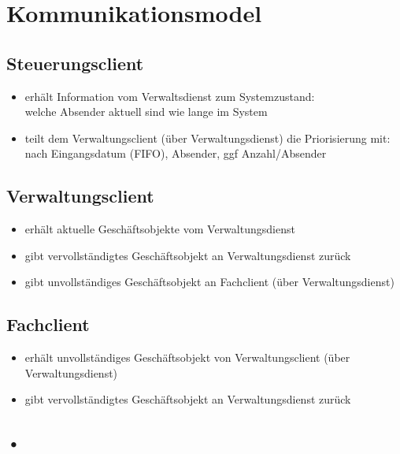\chapter{Kommunikationsmodel}

\begin{comment}
Im Kommunikationsmodell muss ersichtlich sein, welche Informationen zwischen Nutzern in verschiedenen Rollen über das System ausgetauscht werden sollen. Dabei kann es auch wichtig sein die Reihenfolge der Kommunikationsvorgänge zu spezifizieren. 
\end{comment}


\section{Steuerungsclient}
\begin{itemize}
\item erhält Information vom Verwaltsdienst zum Systemzustand:\\
welche Absender aktuell sind wie lange im System
\item teilt dem Verwaltungsclient (über Verwaltungsdienst) die Priorisierung mit:\\
nach Eingangsdatum (FIFO), Absender, ggf Anzahl/Absender
\end{itemize}

\section{Verwaltungsclient}
\begin{itemize}
\item erhält aktuelle Geschäftsobjekte vom Verwaltungsdienst
\item gibt vervollständigtes Geschäftsobjekt an Verwaltungsdienst zurück
\item gibt unvollständiges Geschäftsobjekt an Fachclient (über Verwaltungsdienst)
\end{itemize}


\section{Fachclient}
\begin{itemize}
\item erhält unvollständiges Geschäftsobjekt von Verwaltungsclient (über Verwaltungsdienst)
\item gibt vervollständigtes Geschäftsobjekt an Verwaltungsdienst zurück
\end{itemize}

\section{•}